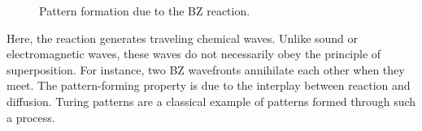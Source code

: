 \documentclass[twocolumn,amsmath,amssymb,aps]{revtex4}
\begin{document}
\begin{figure}
	\centering
	\vspace{+15pt}
	\caption{Pattern formation due to the BZ reaction.}
	\label{fig:Pattern}
\end{figure}


Here, the reaction generates traveling chemical waves. Unlike sound or electromagnetic waves, these waves do not necessarily obey the principle of superposition. For instance, two BZ wavefronts annihilate each other when they meet. The pattern-forming property is due to the interplay between reaction and diffusion. Turing patterns are a classical example of patterns formed through such a process. 
\end{document}
